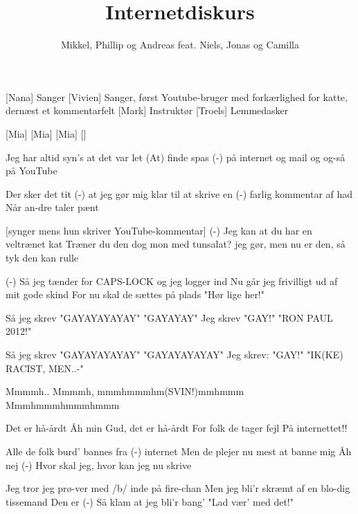 \documentclass[a4paper,11pt]{article}
\title{Internetdiskurs}
\author{Mikkel, Phillip og Andreas feat. Niels, Jonas og Camilla}
\begin{document}
\maketitle

\begin{roles}
[Nana] Sanger
[Vivien] Sanger, først Youtube-bruger med forkærlighed for katte, dernæst et kommentarfelt
[Mark] Instruktør
[Troels] Lemmedasker
\end{roles}

\begin{props}
[Mia]
[Mia]
[Mia]
[]
\end{props}

\begin{song}

Jeg har altid syn's at det var let
(At) finde spas (-) på internet
og mail
og og-så på YouTube

Der sker det tit (-) at jeg gør mig klar
til at skrive en (-) farlig kommentar
af had
Når an-dre taler pænt


[synger mens hun skriver YouTube-kommentar]
(-) Jeg kan at du har en veltrænet kat
Træner du den dog mon med tunsalat?
jeg gør, men nu er den, så tyk den kan rulle

(-) Så jeg tænder for CAPS-LOCK og jeg logger ind
Nu går jeg frivilligt ud af mit gode skind
For nu
skal de sættes på plads
"Hør lige her!"

 Så jeg skrev
 "GAYAYAYAYAY"
"GAYAYAY"
 Jeg skrev
 "GAY!"
"RON PAUL 2012!"

 Så jeg skrev
 "GAYAYAYAYAY"
"GAYAYAYAYAY"
Jeg skrev:
 "GAY!"
"IK(KE) RACIST, MEN..-"


Mmmmh..
Mmmmh, mmmhmmmhm(SVIN!)mmhmmm
Mmmhmmmhmmmhmmm

Det er hå-årdt
Åh min Gud, det er hå-årdt
For folk de tager fejl
På internettet!!
 
Alle de folk burd' bannes  fra (-) internet
Men de plejer nu mest at banne mig
Åh nej
(-) Hvor skal jeg, hvor kan jeg nu skrive

Jeg tror jeg prø-ver med /b/ inde på fire-chan
Men jeg bli'r skræmt af en blo-dig tissemand
Den er
(-) Så klam at jeg bli'r bang'
"Lad vær' med det!"


\end{song}
\end{document}
